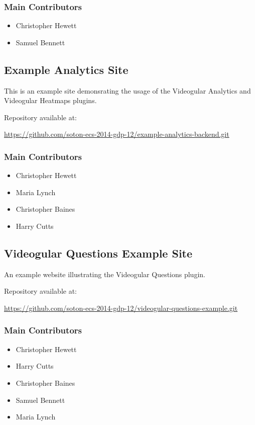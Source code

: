 \subsubsection{Main Contributors}
\begin{itemize}
  \item Christopher Hewett
  \item Samuel Bennett
\end{itemize}

\subsection{Example Analytics Site}
\label{Section:Repo_example_analytics_backend}

This is an example site demonsrating the usage of the Videogular Analytics and Videogular Heatmaps plugins.

Repository available at:

\url{https://github.com/soton-ecs-2014-gdp-12/example-analytics-backend.git}

\subsubsection{Main Contributors}
\begin{itemize}
  \item Christopher Hewett
  \item Maria Lynch
  \item Christopher Baines
  \item Harry Cutts
\end{itemize}

\subsection{Videogular Questions Example Site}
\label{Section:Repo_videogular-questions-example}

An example website illustrating the Videogular Questions plugin.

Repository available at:

\url{https://github.com/soton-ecs-2014-gdp-12/videogular-questions-example.git}

\subsubsection{Main Contributors}
\begin{itemize}
  \item Christopher Hewett
  \item Harry Cutts 
  \item Christopher Baines
  \item Samuel Bennett
  \item Maria Lynch
\end{itemize}


